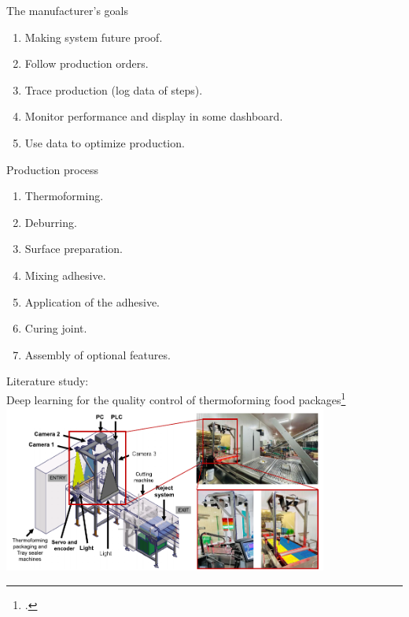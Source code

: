 \documentclass{beamer}
\begin{document}
	\begin{frame}{The manufacturer's goals}
		\begin{enumerate}
			\item Making system future proof.
			\item Follow production orders.
			\item Trace production (log data of steps).
			\item Monitor performance and display in some dashboard.
			\item Use data to optimize production.			
		\end{enumerate}
	\end{frame}

	\begin{frame}{Production process}
		\begin{enumerate}
			\item Thermoforming.
			\item Deburring.
			\item Surface preparation.
			\item Mixing adhesive.
			\item Application of the adhesive.
			\item Curing joint.
			\item Assembly of optional features.
		\end{enumerate}
	\end{frame}
	
	\begin{frame}{Literature study:\\Deep learning for the quality control of thermoforming food packages\footcite{Banus2021}}
		\centering
		\includegraphics[width=0.8\textwidth]{Figures/QualityControlInThermoformingSetup.pdf}
	\end{frame}
\end{document}
